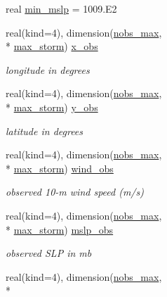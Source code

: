 \begin{DoxyCompactItemize}
\item 
real \hyperlink{classfv__nwp__nudge__mod_a7bc4a9ade4f83f3866673db98fc33230}{min\-\_\-mslp} = 1009.E2
\item 
real(kind=4), dimension(\hyperlink{classfv__nwp__nudge__mod_ac3d3a0cbdfff5f6ed3757fcc2b70309d}{nobs\-\_\-max}, \\*
\hyperlink{classfv__nwp__nudge__mod_aac3d8d546e1954263ae52400f44d2c7c}{max\-\_\-storm}) \hyperlink{classfv__nwp__nudge__mod_a9f06e5f833a9b261ab86ddaade7f3571}{x\-\_\-obs}
\begin{DoxyCompactList}\small\item\em longitude in degrees \end{DoxyCompactList}\item 
real(kind=4), dimension(\hyperlink{classfv__nwp__nudge__mod_ac3d3a0cbdfff5f6ed3757fcc2b70309d}{nobs\-\_\-max}, \\*
\hyperlink{classfv__nwp__nudge__mod_aac3d8d546e1954263ae52400f44d2c7c}{max\-\_\-storm}) \hyperlink{classfv__nwp__nudge__mod_aecc8732e077061904bbf9f1e052c190d}{y\-\_\-obs}
\begin{DoxyCompactList}\small\item\em latitude in degrees \end{DoxyCompactList}\item 
real(kind=4), dimension(\hyperlink{classfv__nwp__nudge__mod_ac3d3a0cbdfff5f6ed3757fcc2b70309d}{nobs\-\_\-max}, \\*
\hyperlink{classfv__nwp__nudge__mod_aac3d8d546e1954263ae52400f44d2c7c}{max\-\_\-storm}) \hyperlink{classfv__nwp__nudge__mod_a0b13b44ac7609d8c641c306310649711}{wind\-\_\-obs}
\begin{DoxyCompactList}\small\item\em observed 10-\/m wind speed (m/s) \end{DoxyCompactList}\item 
real(kind=4), dimension(\hyperlink{classfv__nwp__nudge__mod_ac3d3a0cbdfff5f6ed3757fcc2b70309d}{nobs\-\_\-max}, \\*
\hyperlink{classfv__nwp__nudge__mod_aac3d8d546e1954263ae52400f44d2c7c}{max\-\_\-storm}) \hyperlink{classfv__nwp__nudge__mod_a9eee9ed61c6ec21fa45d4f80a88699fc}{mslp\-\_\-obs}
\begin{DoxyCompactList}\small\item\em observed S\-L\-P in mb \end{DoxyCompactList}\item 
real(kind=4), dimension(\hyperlink{classfv__nwp__nudge__mod_ac3d3a0cbdfff5f6ed3757fcc2b70309d}{nobs\-\_\-max}, \\*

\end{DoxyCompactItemize}
